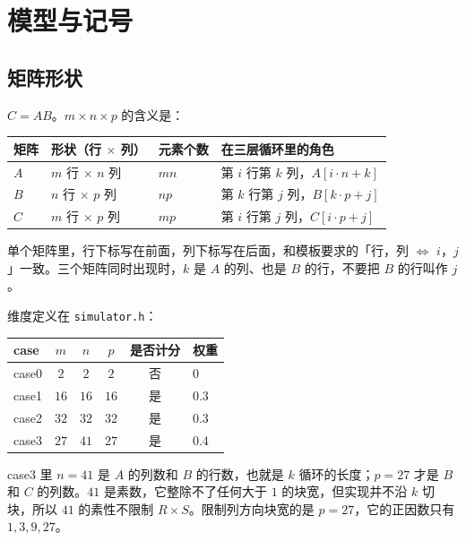 \documentclass[11pt,a4paper,fontset=fandol]{ctexart}
\newcommand{\code}[1]{\texttt{#1}}
\begin{document}
\section{模型与记号}
\label{sec:model}

\subsection{矩阵形状}
\label{sec:shape}

$C=AB$。$m\times n\times p$ 的含义是：

\begin{center}
\begin{tabular}{@{}llll@{}}
\toprule
矩阵 & 形状（行 $\times$ 列） & 元素个数 & 在三层循环里的角色\\
\midrule
$A$ & $m$ 行 $\times$ $n$ 列 & $mn$ & 第 $i$ 行第 $k$ 列，$A[i\cdot n+k]$\\
$B$ & $n$ 行 $\times$ $p$ 列 & $np$ & 第 $k$ 行第 $j$ 列，$B[k\cdot p+j]$\\
$C$ & $m$ 行 $\times$ $p$ 列 & $mp$ & 第 $i$ 行第 $j$ 列，$C[i\cdot p+j]$\\
\bottomrule
\end{tabular}
\end{center}

单个矩阵里，行下标写在前面，列下标写在后面，和模板要求的「行，列 $\Leftrightarrow$ $i$，$j$」一致。三个矩阵同时出现时，$k$ 是 $A$ 的列、也是 $B$ 的行，不要把 $B$ 的行叫作 $j$。

维度定义在 \code{simulator.h}：

\begin{center}
\begin{tabular}{@{}lccccl@{}}
\toprule
case & $m$ & $n$ & $p$ & 是否计分 & 权重\\
\midrule
case0 & $2$ & $2$ & $2$ & 否 & $0$\\
case1 & $16$ & $16$ & $16$ & 是 & $0.3$\\
case2 & $32$ & $32$ & $32$ & 是 & $0.3$\\
case3 & $27$ & $41$ & $27$ & 是 & $0.4$\\
\bottomrule
\end{tabular}
\end{center}

case3 里 $n=41$ 是 $A$ 的列数和 $B$ 的行数，也就是 $k$ 循环的长度；$p=27$ 才是 $B$ 和 $C$ 的列数。$41$ 是素数，它整除不了任何大于 $1$ 的块宽，但实现并不沿 $k$ 切块，所以 $41$ 的素性不限制 $R\times S$。限制列方向块宽的是 $p=27$，它的正因数只有 $1,3,9,27$。
\end{document}
